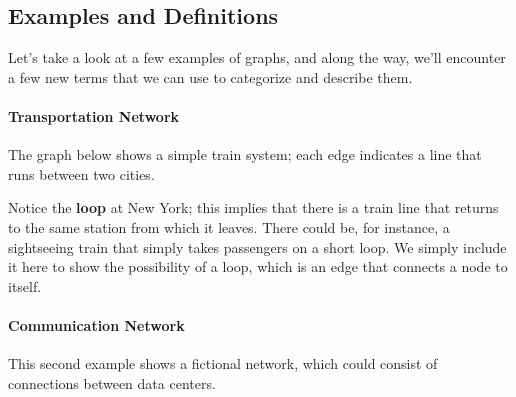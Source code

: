 \subsection{Examples and Definitions}
Let's take a look at a few examples of graphs, and along the way, we'll encounter a few new terms that we can use to categorize and describe them.

\paragraph{Transportation Network} The graph below shows a simple train system; each edge indicates a line that runs between two cities.

\begin{center}
\end{center}

Notice the \textbf{loop} at New York; this implies that there is a train line that returns to the same station from which it leaves.  There could be, for instance, a sightseeing train that simply takes passengers on a short loop.  We simply include it here to show the possibility of a loop, which is an edge that connects a node to itself.
\pagebreak

\paragraph{Communication Network} This second example shows a fictional network, which could consist of connections between data centers.

